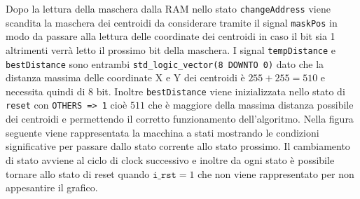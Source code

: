 \documentclass{article}
\begin{document}
\newline 
Dopo la lettura della maschera dalla RAM nello stato \texttt{changeAddress} viene scandita la maschera dei centroidi da considerare tramite il signal \texttt{maskPos} in modo da passare alla lettura delle coordinate dei centroidi in caso il bit sia 1 altrimenti verr\`{a} letto il prossimo bit della maschera.
\newline
I signal \texttt{tempDistance} e \texttt{bestDistance} sono entrambi \texttt{std\_logic\_vector(8 DOWNTO 0)} dato che la distanza massima delle coordinate X e Y dei centroidi \`{e} $255+255=510$ e necessita quindi di 8 bit. Inoltre \texttt{bestDistance} viene inizializzata nello stato di \texttt{reset} con \texttt{OTHERS => \textsc{}1\textsc{}} cio\`{e} $511$ che \`{e} maggiore della massima distanza possibile dei centroidi e permettendo il corretto funzionamento dell'algoritmo.
\newline
Nella figura seguente viene rappresentata la macchina a stati mostrando le condizioni significative per passare dallo stato corrente allo stato prossimo. Il cambiamento di stato avviene al ciclo di clock successivo e inoltre da ogni stato \`{e} possibile tornare allo stato di reset quando $\texttt{i\_rst}=1$ che non viene rappresentato per non appesantire il grafico.
\pagebreak


 
\pagebreak
\end{document}
